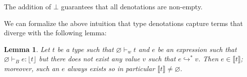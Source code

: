 \documentclass[11pt]{article}
\newtheorem{lemma}[theorem]{Lemma}
\newcommand{\bind}{\hspace{0.05em}{:}\hspace{0.05em}} %
\newcommand{\col}{\mathbin{:}}       %
\newcommand{\lb}{\llbracket}         %
\newcommand{\rb}{\rrbracket}         %
\newcommand{\many}{\hookrightarrow^*}
\newcommand{\functype}[3]{#1\bind #2 \rightarrow #3}
\begin{document}
The addition of $\bot$ guarantees that all denotations are non-empty.\begin{comment}
\begin{lemma}\label{non-empty}
Let $t$ be a type such that $\Gamma \vdash_w t$. Then there exists a term $e$ such that for every $\theta \in \lb \Gamma \rb$, we have $e \in \lb \theta(t)\rb$. In particular, if $\varnothing \vdash_w t$, then $\lb t \rb \neq \varnothing$.
\end{lemma}
\begin{proof} We proceed by induction on the derivation of $\Gamma \vdash_w t$(i.e. on the structure of the type $t$).

{\bf Case} {\sc WF-Base}: This follows trivially because $b$ has no free variables and for each base type, $\lb b\rb \neq \varnothing$.

{\bf Case} {\sc WF-Refn}: We have $\Gamma \vdash_w t$ and $t \equiv b\{x\col p\}$. Let $e = \bot$. Then for any $\theta \in \lb\Gamma\rb$, $\bot \in \lb b\{x \col \theta(p)\}\rb = \lb\theta(t)\rb$ by definition.

{\bf Case} {\sc WF-Func}: We have $\Gamma \vdash_w t$ and $t \equiv \functype{x}{t_x}{t'}$. By inversion we have
\begin{equation}
\Gamma \vdash_w t_x \quad {\rm and} \quad \Gamma, x\bind t_x \vdash_w t'.
\end{equation}
By the inductive hypothesis, there exists some term $e'$ such that for any $\theta' \in \lb \Gamma, x\bind t_x \rb$ we have $e' \in \lb\theta'(t')\rb$. Set $e = \lambda x.\, e'$. Let $\theta \in \lb\Gamma\rb$ and let $e_x \in \lb \theta(t_x) \rb$. Then $(\theta, x\mapsto e_x) \in \lb\Gamma, x\bind t_x\rb$ and so we have $e\; e_x$
\end{proof}
\end{comment}
We can formalize the above intuition that type denotations capture terms that diverge with the following lemma:
\begin{lemma}\label{denote-diverge}
Let $t$ be a type such that $\varnothing \vdash_w t$ and $e$ be an expression such that $\varnothing \vdash_B e : \lfloor t \rfloor$ but there does not exist any value $v$ such that $e \many v$. Then $e \in \lb t \rb$; moreover, such an $e$ always exists so in particular $\lb t \rb \neq \varnothing$.
\end{lemma}
\end{document}

